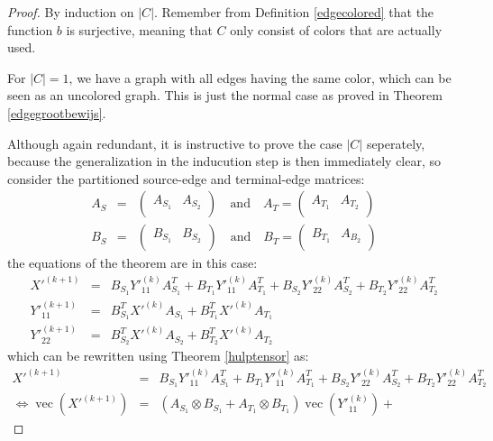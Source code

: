 \documentclass[a4paper,11pt]{report}
\newcommand{\vect}{\operatorname{vec}}
\begin{document}
\begin{proof}
  By induction on $|C|$. Remember from Definition \ref{edgecolored} that the 
  function $b$ is surjective, meaning that $C$ only consist of colors that are 
  actually used.
  
  For $|C| = 1$, we have a graph with all edges having the same color, which can 
  be seen as an uncolored graph. This is just the normal case as proved in 
  Theorem \ref{edgegrootbewijs}.
  
  Although again redundant, it is instructive to prove the case $|C|$ seperately, 
  because the generalization in the inducution step is then immediately clear, so 
  consider the partitioned source-edge and terminal-edge matrices:
  \begin{eqnarray*}
    A_S &=& \begin{pmatrix}
A_{S_1} & A_{S_2}\\
\end{pmatrix} \quad \text{and} \quad  A_T = \begin{pmatrix}
A_{T_1} & A_{T_2}\\
\end{pmatrix}\\
    B_S &=& \begin{pmatrix}
B_{S_1} & B_{S_2}\\
\end{pmatrix} \quad \text{and} \quad  B_T = \begin{pmatrix}
B_{T_1} & A_{B_2}\\
\end{pmatrix}
  \end{eqnarray*}
  the equations of the theorem are in this case:
   \begin{eqnarray*}
   X'^{(k+1)} &=& B_{S_1}Y'^{(k)}_{11} A^T_{S_1} +  B_{T_1}Y'^{(k)}_{11} 
   A^T_{T_1} +  B_{S_2}Y'^{(k)}_{22} A^T_{S_2} +  B_{T_2}Y'^{(k)}_{22} 
   A^T_{T_2}\\
   Y'^{(k+1)}_{11} &=& B^T_{S_1}X'^{(k)}A_{S_1} + B^T_{T_1}X'^{(k)}A_{T_1}\\
   Y'^{(k+1)}_{22} &=& B^T_{S_2}X'^{(k)}A_{S_2} + B^T_{T_2}X'^{(k)}A_{T_2}
    \end{eqnarray*}
which can be rewritten using Theorem \ref{hulptensor} as:
\begin{eqnarray*}
  X'^{(k+1)} &=& B_{S_1}Y'^{(k)}_{11} A^T_{S_1} +  B_{T_1}Y'^{(k)}_{11} 
   A^T_{T_1} +  B_{S_2}Y'^{(k)}_{22} A^T_{S_2} +  B_{T_2}Y'^{(k)}_{22} 
   A^T_{T_2} \\
  \Leftrightarrow\vect(X'^{(k+1)}) &=& (A_{S_1} \otimes  B_{S_1} + A_{T_1} \otimes B_{T_1})\vect(Y'^{(k)}_{11}) + 

\end{eqnarray*}
\end{proof}
\end{document}
